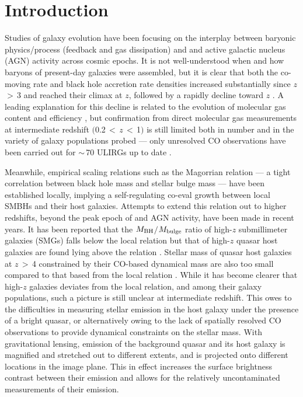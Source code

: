 \documentclass[]{emulateapj}
\begin{document}
\section{Introduction}
Studies of galaxy evolution have been focusing on the interplay between baryonic physics/process
(\eg feedback and gas dissipation) and \SF and active galactic nucleus (AGN) activity across cosmic epochs.
It is not well-understood when and how baryons of present-day galaxies were assembled, 
but it is clear that both the co-moving \SF rate and black hole accretion rate densities
increased substantially since $z$\,$>$\,3 and reached their climax at $z$, followed by 
a rapidly decline toward $z$ \citep[\eg][]{Hopkins06a, Madau14a}. 
A leading explanation for this decline is related to the evolution of molecular gas content and 
\SF efficiency \citep[]{Erb06a, CW13, Walter14a},
but confirmation from direct molecular gas measurements at intermediate redshift 
$($0.2\,$<$\,$z$\,$<$\,1$)$ is still limited both in number and in the variety of galaxy populations probed --- 
only unresolved CO observations have been carried out for $\sim$\,70 ULIRGs up to date \citep{Combes11a, Combes13a}.

Meanwhile, empirical scaling relations such as the Magorrian relation \citep{Magorrian98a}
--- a tight correlation between black hole mass and stellar bulge mass ---
have been established locally, implying a self-regulating co-eval growth between local SMBHs and their host galaxies.
Attempts to extend this relation out to higher redshifts, beyond the peak epoch 
of \SF and AGN activity, have been made in recent years.
It has been reported that the $M_{\rm BH}$$/$$M_{\rm bulge}$ ratio of high-$z$ submillimeter galaxies (SMGs) falls below 
the local relation \citep[\eg][]{Borys05a,Alexander08a} but that of high-$z$ quasar host galaxies are found 
lying above 
the relation \citep[\eg][]{McLure06a,Peng06a}.
Stellar mass of quasar host galaxies at $z$\,$>$\,4 constrained by their CO-based dynamical mass 
are also too small compared to that based from the local relation \citep{Walter04a, Riechers08a,Coppin08a}. 
While it has become clearer that high-$z$ galaxies deviates from the local relation, and among their galaxy populations, 
such a picture is still unclear  at intermediate redshift.
This owes to the difficulties in measuring stellar emission in the host galaxy under the presence of a bright quasar, or alternatively
owing to the lack of spatially resolved CO observations to provide dynamical constraints on the stellar mass. 
With gravitational lensing, emission of the background quasar and its host galaxy 
is magnified and stretched out to different extents, and is projected onto different locations in the image plane.
This in effect increases the surface brightness contrast between their emission and allows for the
relatively uncontaminated measurements of their emission. 
\end{document}
